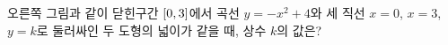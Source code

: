 \noindent\begin{minipage}[t]{0.58\linewidth}\vspace{0pt}\raggedright 오른쪽 그림과 같이 닫힌구간 $[0{,}\mkern3mu\mathopen{}3]$에서 곡선 $y=-x^2+4$와 세 직선 $x=0$, $x=3$, $y=k$로 둘러싸인 두 도형의 넓이가 같을 때, 상수 $k$의 값은? \end{minipage}\hfill\begin{minipage}[t]{0.4\linewidth}\vspace{0pt}\centering \resizebox{\ifdim\width>\linewidth\linewidth\else\width\fi}{!}{}\end{minipage}\par
{}
